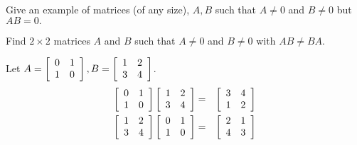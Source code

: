 \begin{enumialphparenastyle}
\begin{ex} Give an example of matrices (of any size), $A,B$ such that $A \neq 0$ and $B \neq 0$ but  $AB=0.$
\end{ex}

\begin{ex} Find $2 \times 2$ matrices $A$ and $B$ such that $A \neq 0$ and $B \neq 0$ with $AB \neq BA$. 
\begin{sol}
Let $A = \left[
\begin{array}{cc}
0 & 1 \\
1 & 0
\end{array}
\right] , B = \left[
\begin{array}{cc}
1 & 2 \\
3 & 4
\end{array}
\right] $. 
\begin{eqnarray*}
\left[
\begin{array}{cc}
0 & 1 \\
1 & 0
\end{array}
\right]
 \left[
\begin{array}{cc}
1 & 2 \\
3 & 4
\end{array}
\right]  &=&
 \left[
\begin{array}{cc}
3 & 4 \\
1 & 2
\end{array}
\right] \\
\left[
\begin{array}{cc}
1 & 2 \\
3 & 4
\end{array}
\right] \left[
\begin{array}{cc}
0 & 1 \\
1 & 0
\end{array}
\right]
&=& \left[
\begin{array}{cc}
2 & 1 \\
4 & 3
\end{array}
\right]
\end{eqnarray*}
\end{sol}
\end{ex}



\end{enumialphparenastyle}
